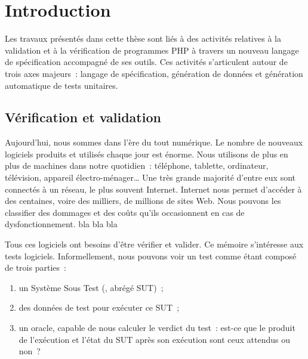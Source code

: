 \chapter{Introduction}
\label{chapter:introduction}

\minitoc

Les travaux présentés dans cette thèse sont liés à des activités relatives à la
validation et à la vérification de programmes PHP à travers un nouveau langage
de spécification accompagné de ses outils. Ces activités s'articulent autour de
trois axes majeurs~: langage de spécification, génération de données et
génération automatique de tests unitaires.

\section{Vérification et validation}

Aujourd'hui, nous sommes dans l'ère du tout numérique. Le nombre de nouveaux
logiciels produits et utilisés chaque jour est énorme. Nous utilisons de plus en
plus de machines dans notre quotidien~: téléphone, tablette, ordinateur,
télévision, appareil électro-ménager… Une très grande majorité d'entre eux sont
connectés à un réseau, le plus souvent Internet. Internet nous permet d'accéder
à des centaines, voire des milliers, de millions de sites Web. Nous pouvons les
classifier des dommages et des coûts qu'ils occasionnent en cas de
dysfonctionnement. bla bla bla

Tous ces logiciels ont besoins d'être vérifier et valider. Ce mémoire
s'intéresse aux tests logiciels. Informellement, nous pouvons voir un test comme
étant composé de trois parties~:

\begin{enumerate}

\item un Système Sous Test (, abrégé {\strong
SUT})~;

\item des {\strong données de test} pour exécuter ce SUT~;

\item un {\strong oracle}, capable de nous calculer le verdict du test~: est-ce
que le produit de l'exécution et l'état du SUT après son exécution sont ceux
attendus ou non~?

\end{enumerate}

